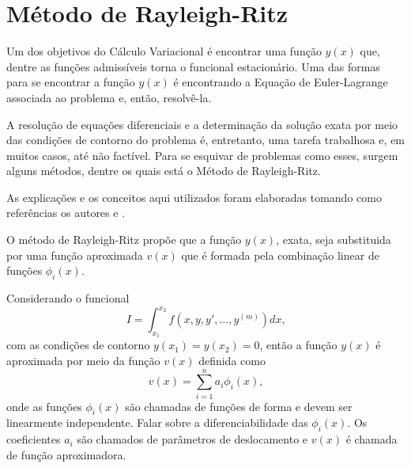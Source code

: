 \documentclass[
	12pt,				%
	openright,			%
    twoside,			%
	a4paper,			%
	english,			%
	french,				%
	spanish,			%
	brazil				%
	]{abntex2}
\numberwithin{lema}{chapter}
\numberwithin{teorema}{chapter}
\numberwithin{definicao}{chapter}
\numberwithin{exemplo}{chapter}
\numberwithin{figure}{chapter}
\begin{document}



\chapter{Método de Rayleigh-Ritz}
\label{cap:mrr}

Um dos objetivos do Cálculo Variacional é encontrar uma função $y(x)$ que, dentre as funções admissíveis torna o funcional estacionário. Uma das formas para se encontrar a função $y(x)$ é encontrando a Equação de Euler-Lagrange associada ao problema e, então, resolvê-la. 

A resolução de equações diferenciais e a determinação da solução exata por meio das condições de contorno do problema é, entretanto,  uma tarefa trabalhosa e, em muitos casos, até não factível. Para se esquivar de problemas como esses, surgem alguns métodos, dentre os quais está o Método de Rayleigh-Ritz.

As explicações e os conceitos aqui utilizados foram elaboradas tomando como referências os autores  e .

O método de Rayleigh-Ritz propõe que a função $y(x)$, exata, seja substituida por uma função aproximada $v(x)$ que é formada pela combinação linear de funções $\phi _i(x)$. 

Considerando o funcional
$$
	I=\int_{x_1}^{x_2} f(x,y,y',\dots,y^{(m)})dx
	\text{,}
$$
com as condições de contorno $y(x_1)=y(x_2)=0$, então a função $y(x)$ é aproximada por meio da função $v(x)$ definida como
$$
	v(x) = \sum_{i=1}^n a_i \phi _i (x)
	\text{,}
$$
onde as funções $\phi_i(x)$ são chamadas de funções de forma e devem ser linearmente independente. {\color{red}Falar sobre a diferenciabilidade das $\phi_i(x)$.} Os coeficientes $a_i$ são chamados de parâmetros de deslocamento e $v(x)$ é chamada de função aproximadora.
\end{document}
